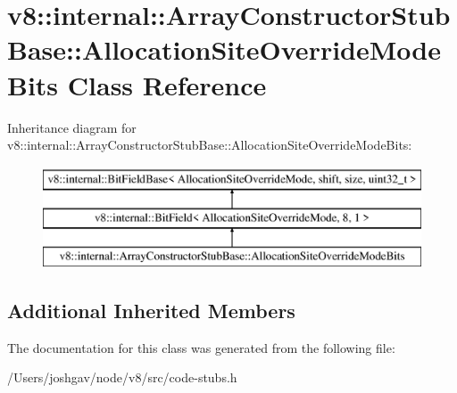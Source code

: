 \hypertarget{classv8_1_1internal_1_1_array_constructor_stub_base_1_1_allocation_site_override_mode_bits}{}\section{v8\+:\+:internal\+:\+:Array\+Constructor\+Stub\+Base\+:\+:Allocation\+Site\+Override\+Mode\+Bits Class Reference}
\label{classv8_1_1internal_1_1_array_constructor_stub_base_1_1_allocation_site_override_mode_bits}
Inheritance diagram for v8\+:\+:internal\+:\+:Array\+Constructor\+Stub\+Base\+:\+:Allocation\+Site\+Override\+Mode\+Bits\+:\begin{figure}[H]
\begin{center}
\leavevmode
\includegraphics[height=3.000000cm]{classv8_1_1internal_1_1_array_constructor_stub_base_1_1_allocation_site_override_mode_bits}
\end{center}
\end{figure}
\subsection*{Additional Inherited Members}


The documentation for this class was generated from the following file\+:\begin{DoxyCompactItemize}
\item 
/\+Users/joshgav/node/v8/src/code-\/stubs.\+h\end{DoxyCompactItemize}
